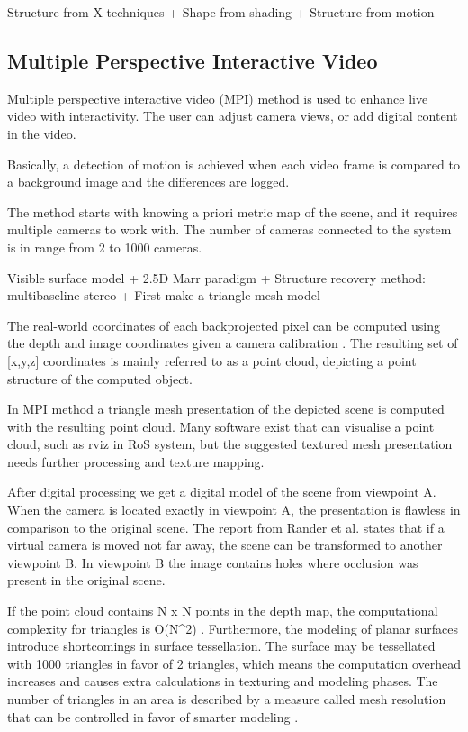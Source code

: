 \documentclass[12pt,a4paper,oneside,pdftex]{report}
\begin{document}
{Structure from X techniques
+ Shape from shading
+ Structure from motion

\subsection{Multiple Perspective Interactive Video}

Multiple perspective interactive video (MPI) method is used to enhance live video with interactivity. The user can adjust camera views, or add digital content in the video. 

Basically, a detection of motion is achieved when each video frame is compared to a background image and the differences are logged. 

The method starts with knowing a priori metric map of the scene, and it requires multiple cameras to work with. The number of cameras connected to the system is in range from 2 to 1000 cameras.

Visible surface model
+ 2.5D Marr paradigm
+ Structure recovery method: multibaseline stereo
+ First make a triangle mesh model 

The real-world coordinates of each backprojected pixel can be computed using the depth and image coordinates given a camera calibration \cite{Rander97}. The resulting set of [x,y,z] coordinates is mainly referred to as a point cloud, depicting a point structure of the computed object.

In MPI method a triangle mesh presentation of the depicted scene is computed with the resulting point cloud. Many software exist that can visualise a point cloud, such as rviz in RoS system, but the suggested textured mesh presentation needs further processing and texture mapping. 

After digital processing we get a digital model of the scene from viewpoint A. When the camera is located exactly in viewpoint A, the presentation is flawless in comparison to the original scene. The report from Rander et al. \cite{Rander97} states that if a virtual camera is moved not far away, the scene can be transformed to another viewpoint B. In viewpoint B the image contains holes where occlusion was present in the original scene.

If the point cloud contains N x N points in the depth map, the computational complexity for triangles is O(N^2) \cite{Rander97}. Furthermore, the modeling of planar surfaces introduce shortcomings in surface tessellation. The surface may be tessellated with 1000 triangles in favor of 2 triangles, which means the computation overhead increases and causes extra calculations in texturing and modeling phases. The number of triangles in an area is described by a measure called mesh resolution that can be controlled in favor of smarter modeling \cite{Johnson96}.

}
\end{document}
